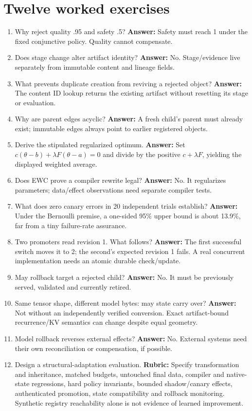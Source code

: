 \section{Twelve worked exercises}
\label{evod43:exercises}
\begin{enumerate}
\item Why reject quality .95 and safety .5? \textbf{Answer:} Safety must
reach 1 under the fixed conjunctive policy. Quality cannot compensate.
\item Does stage change alter artifact identity? \textbf{Answer:} No.
Stage/evidence live separately from immutable content and lineage fields.
\item What prevents duplicate creation from reviving a rejected object?
\textbf{Answer:} The content ID lookup returns the existing artifact without
resetting its stage or evaluation.
\item Why are parent edges acyclic? \textbf{Answer:} A fresh child's parent
must already exist; immutable edges always point to earlier registered objects.
\item Derive the stipulated regularized optimum. \textbf{Answer:} Set
$c(\theta-b)+\lambda F(\theta-a)=0$ and divide by the positive
$c+\lambda F$, yielding the displayed weighted average.
\item Does EWC prove a compiler rewrite legal? \textbf{Answer:} No. It
regularizes parameters; data/effect observations need separate compiler tests.
\item What does zero canary errors in 20 independent trials establish?
\textbf{Answer:} Under the Bernoulli premise, a one-sided 95\% upper bound
is about 13.9\%, far from a tiny failure-rate assurance.
\item Two promoters read revision 1. What follows? \textbf{Answer:} The
first successful switch moves it to 2; the second's expected revision 1 fails.
A real concurrent implementation needs an atomic durable check/update.
\item May rollback target a rejected child? \textbf{Answer:} No. It must
be previously served, validated and currently retired.
\item Same tensor shape, different model bytes: may state carry over?
\textbf{Answer:} Not without an independently verified conversion. Exact
artifact-bound recurrence/KV semantics can change despite equal geometry.
\item Model rollback reverses external effects? \textbf{Answer:} No.
External systems need their own reconciliation or compensation, if possible.
\item Design a structural-adaptation evaluation. \textbf{Rubric:} Specify
transformation and inheritance, matched budgets, untouched final data, compiler
and native-state regressions, hard policy invariants, bounded shadow/canary
effects, authenticated promotion, state compatibility and rollback monitoring.
Synthetic registry reachability alone is not evidence of learned improvement.
\end{enumerate}

